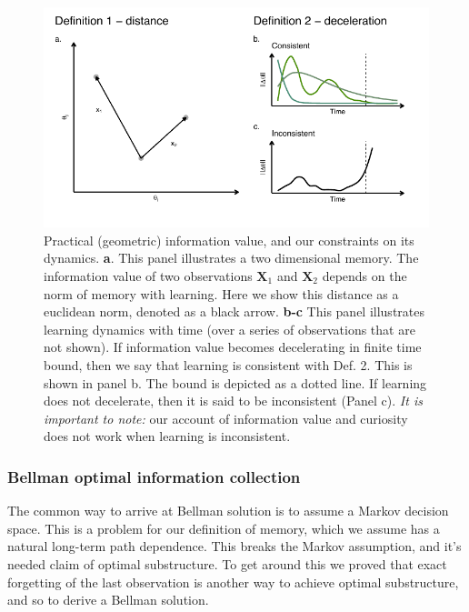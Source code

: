 \begin{figure}
	\begin{fullwidth}
	\includegraphics[width=0.95\linewidth]{img/cartoon.pdf} 
	\caption{Practical (geometric) information value, and our constraints on its dynamics. 
	\textbf{a}. This panel illustrates a two dimensional memory. The information value of two observations $\mathbf{X}_1$ and $\mathbf{X}_2$ depends on the norm of memory with learning. Here we show this distance as a euclidean norm, denoted as a black arrow.
	\textbf{b-c} This panel illustrates learning dynamics with time (over a series of observations that are not shown). If information value becomes decelerating in finite time bound, then we say that learning is consistent with Def. 2. This is shown in panel b. The bound is depicted as a dotted line. If learning does not decelerate, then it is said to be inconsistent (Panel c). \textit{It is important to note:} our account of information value and curiosity does not work when learning is inconsistent.
  	}
	\label{fig:cartoon} 
	\end{fullwidth}
\end{figure}

\subsubsection*{Bellman optimal information collection}
The common way to arrive at Bellman solution is to assume a Markov decision space. This is a problem for our definition of memory, which we assume has a natural long-term path dependence. This breaks the Markov assumption, and it's needed claim of optimal substructure. To get around this we proved that exact forgetting of the last observation is another way to achieve optimal substructure, and so to derive a Bellman solution.

